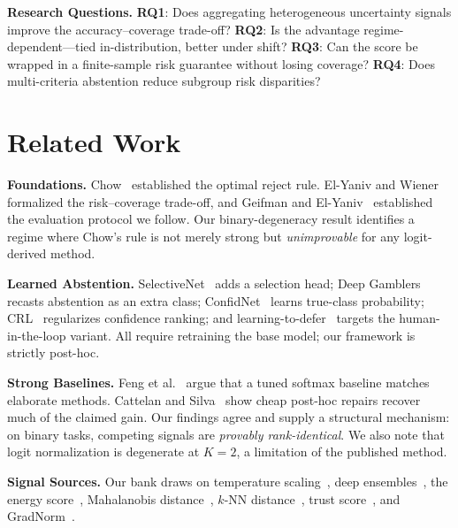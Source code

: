 \documentclass[conference]{IEEEtran}
\begin{document}
\textbf{Research Questions.}
\textbf{RQ1}: Does aggregating heterogeneous uncertainty signals improve the accuracy--coverage trade-off?
\textbf{RQ2}: Is the advantage regime-dependent---tied in-distribution, better under shift?
\textbf{RQ3}: Can the score be wrapped in a finite-sample risk guarantee without losing coverage?
\textbf{RQ4}: Does multi-criteria abstention reduce subgroup risk disparities?

\section{Related Work}
\label{sec:related}

\textbf{Foundations.} Chow~\cite{chow1970} established the optimal reject rule. El-Yaniv and Wiener~\cite{elyaniv2010foundations} formalized the risk--coverage trade-off, and Geifman and El-Yaniv~\cite{geifman2017selective} established the evaluation protocol we follow. Our binary-degeneracy result identifies a regime where Chow's rule is not merely strong but \emph{unimprovable} for any logit-derived method.

\textbf{Learned Abstention.} SelectiveNet~\cite{geifman2019selectivenet} adds a selection head; Deep Gamblers~\cite{liu2019deepgamblers} recasts abstention as an extra class; ConfidNet~\cite{corbiere2019confidnet} learns true-class probability; CRL~\cite{moon2020crl} regularizes confidence ranking; and learning-to-defer~\cite{mozannar2020defer} targets the human-in-the-loop variant. All require retraining the base model; our framework is strictly post-hoc.

\textbf{Strong Baselines.} Feng et al.~\cite{feng2023better} argue that a tuned softmax baseline matches elaborate methods. Cattelan and Silva~\cite{cattelan2023logitnorm} show cheap post-hoc repairs recover much of the claimed gain. Our findings agree and supply a structural mechanism: on binary tasks, competing signals are \emph{provably rank-identical}. We also note that logit normalization is degenerate at $K{=}2$, a limitation of the published method.

\textbf{Signal Sources.} Our bank draws on temperature scaling~\cite{guo2017calibration}, deep ensembles~\cite{lakshminarayanan2017ensembles}, the energy score~\cite{liu2020energy}, Mahalanobis distance~\cite{lee2018mahalanobis}, $k$-NN distance~\cite{sun2022knn}, trust score~\cite{jiang2018trustscore}, and GradNorm~\cite{huang2021gradnorm}.
\end{document}
